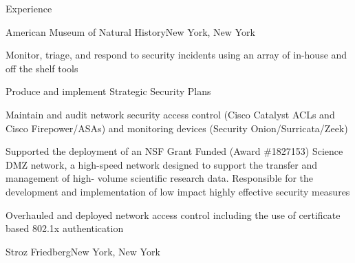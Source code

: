\documentclass[]{mcdowellcv}
\begin{document}
\makeheader
      

\begin{cvsection}{Experience}

    \begin{jobentry}{American Museum of Natural History}{New York, New York}
        
        
        \begin{jobresponsibilities}
            \item Monitor, triage, and respond to security incidents using an array of in-house and off the
    shelf tools
            \item Produce and implement Strategic Security Plans
            \item Maintain and audit network security access control (Cisco Catalyst ACLs and Cisco
    Firepower/ASAs) and monitoring devices (Security Onion/Surricata/Zeek)
        \end{jobresponsibilities}
        
        \begin{jobprojects}
            \item Supported the deployment of an NSF Grant Funded (Award \#1827153) Science DMZ
    network, a high-speed network designed to support the transfer and management of high-
    volume scientific research data. Responsible for the development and implementation of
    low impact highly effective security measures
            \item Overhauled and deployed network access control including the use of certificate based
    802.1x authentication
        \end{jobprojects}
    \end{jobentry}

\begin{jobentry}{Stroz Friedberg}{New York, New York}
        

\end{jobentry}
\end{cvsection}
\end{document}
